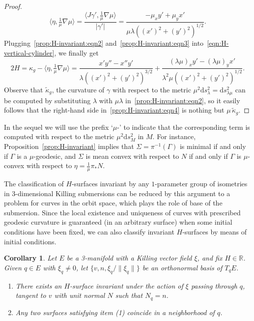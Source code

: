 \documentclass[a4paper,10pt,reqno]{amsart}
\newcommand{\R}{\mathbb{R}}
\newcommand{\df}{\mathrm{d}}
\newtheorem{corollary}[theorem]{Corollary}
\theoremstyle{definition}
\theoremstyle{remark}
\numberwithin{equation}{section}
\begin{document}
\begin{proof}
\begin{equation}
	\langle\eta,\tfrac{1}{\mu}\nabla\mu\rangle=\frac{\langle J\gamma',\tfrac{1}{\mu}\nabla\mu\rangle}{|\gamma'|}=\frac{-\mu_x y'+\mu_y x'}{\mu\lambda((x')^2+(y')^2)^{1/2}}.
\end{equation}
Plugging~\eqref{prop:H-invariant:eqn2} and~\eqref{prop:H-invariant:eqn3} into~\eqref{eqn:H-vertical-cylinder}, we finally get
\begin{equation}\label{prop:H-invariant:eqn4}
	2H=\kappa_g-\langle\eta,\tfrac{1}{\mu}\nabla\mu\rangle=\frac{x'y''-x''y'}{\lambda((x')^2+(y')^2)^{3/2}}+\frac{(\lambda\mu)_x y'-(\lambda\mu)_y x'}{\lambda^2\mu((x')^2+(y')^2)^{1/2}}.
\end{equation}
Observe that $\widetilde\kappa_g$, the curvature of $\gamma$ with respect to the metric $\mu^2\df s_\lambda^2=\df s_{\lambda\mu}^2$ can be computed by substituting $\lambda$ with $\mu\lambda$ in~\eqref{prop:H-invariant:eqn2}, so it easily follows that the right-hand side in~\eqref{prop:H-invariant:eqn4} is nothing but $\mu\,\widetilde\kappa_g$.
\end{proof}
		
In the sequel we will use the prefix `$\mu$-' to indicate that the corresponding term is computed with respect to the metric $\mu^2\df s_M^2$ in $M$. For instance, Proposition~\ref{prop:H-invariant} implies that $\Sigma=\pi^{-1}(\Gamma)$ is minimal if and only if $\Gamma$ is a $\mu$-geodesic, and $\Sigma$ is mean convex with respect to $N$ if and only if $\Gamma$ is $\mu$-convex with respect to $\eta=\frac{1}{\mu}\pi_*N$.

The classification of $H$-surfaces invariant by any $1$-parameter group of isometries in 3-dimensional Killing submersions can be reduced by this argument to a problem for curves in the orbit space, which plays the role of base of the submersion. Since the local existence and uniqueness of curves with prescribed geodesic curvature is guaranteed (in an arbitrary surface) when some initial conditions have been fixed, we can also classify invariant $H$-surfaces by means of initial conditions.
		
\begin{corollary}\label{coro:invariant-H-surfaces}
Let $E$ be a 3-manifold with a Killing vector field $\xi$, and fix $H\in\R$. Given $q\in E$ with $\xi_q\neq 0$, let $\{v,n,\xi_q/\|\xi_q\|\}$ be an orthonormal basis of $T_qE$.
\begin{enumerate}[label=\emph{(\arabic*)}]
	\item There exists an $H$-surface invariant under the action of $\xi$ passing through $q$, tangent to $v$ with unit normal $N$ such that $N_q=n$.
	\item Any two surfaces satisfying item \emph{(1)} coincide in a neighborhood of $q$.
\end{enumerate}
\end{corollary}
\end{document}
